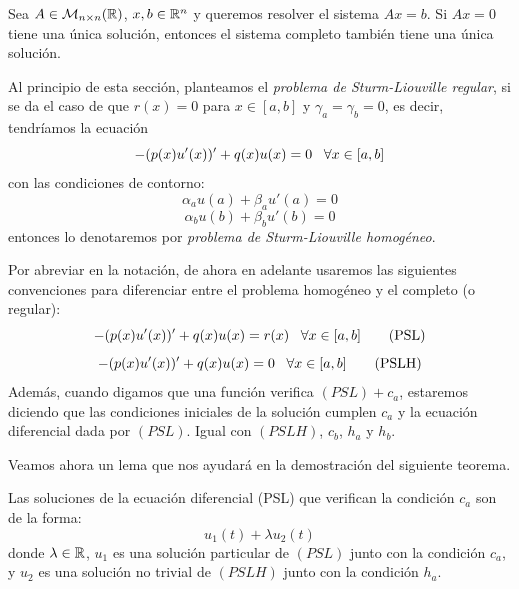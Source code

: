 \begin{remark}
Sea $A\in\mathcal{M}_{n\times n}(\mathbb{R})$, $x,b\in\mathbb{R}^n$ y queremos resolver el sistema $Ax=b$. Si $Ax=0$  tiene una única solución, entonces el sistema completo también tiene una única solución.
\end{remark}

Al principio de esta sección, planteamos el \textit{problema de Sturm-Liouville regular}, si se da el caso de que $r(x)=0$ para $x\in[a,b]$ y $\gamma_a=\gamma_b=0$, es decir, tendríamos la ecuación
\[
-(p(x)u'(x))'+q(x)u(x)=0 \;\;\; \forall x\in[a,b]
\]
con las condiciones de contorno:
\begin{equation}\label{eq:ha}
\alpha_au(a)+\beta_au'(a)=0 \tag{$h_a$}
\end{equation}
\begin{equation}\label{eq:hb}
\alpha_bu(b)+\beta_bu'(b)=0 \tag{$h_b$}
\end{equation}
entonces lo denotaremos por \textit{problema de Sturm-Liouville homogéneo}. 
\begin{remark}
Por abreviar en la notación, de ahora en adelante usaremos las siguientes convenciones para diferenciar entre el problema homogéneo y el completo (o regular):
\begin{equation}\label{eq:psl}
-(p(x)u'(x))'+q(x)u(x)=r(x) \;\;\; \forall x\in[a,b]\tag{PSL}
\end{equation}
\begin{equation}\label{eq:pslh}
-(p(x)u'(x))'+q(x)u(x)=0 \;\;\; \forall x\in[a,b]\tag{PSLH}
\end{equation}
Además, cuando digamos que una función verifica $(PSL)+c_a$, estaremos diciendo que las condiciones iniciales de la solución cumplen $c_a$ y la ecuación diferencial dada por $(PSL)$. Igual con $(PSLH)$, $c_b$, $h_a$ y $h_b$.
\end{remark}

Veamos ahora un lema que nos ayudará en la demostración del siguiente teorema.

\begin{lemma}
Las soluciones de la ecuación diferencial (PSL) que verifican la condición $c_a$ son de la forma:
\[
u_1(t)+\lambda u_2(t)
\]
donde $\lambda\in\mathbb{R}$, $u_1$ es una solución particular de $(PSL)$ junto con la condición $c_a$, y $u_2$ es una solución no trivial de $(PSLH)$ junto con la condición $h_a$.
\end{lemma}

